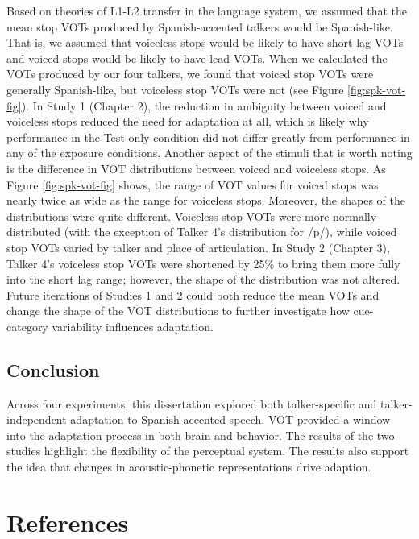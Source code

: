 \documentclass[
  12pt,
  twoside]{article}
\begin{document}
Based on theories of L1-L2 transfer in the language system, we assumed that the mean stop VOTs produced by Spanish-accented talkers would be Spanish-like.
That is, we assumed that voiceless stops would be likely to have short lag VOTs and voiced stops would be likely to have lead VOTs.
When we calculated the VOTs produced by our four talkers, we found that voiced stop VOTs were generally Spanish-like, but voiceless stop VOTs were not (see Figure \ref{fig:spk-vot-fig}).
In Study 1 (Chapter 2), the reduction in ambiguity between voiced and voiceless stops reduced the need for adaptation at all, which is likely why performance in the Test-only condition did not differ greatly from performance in any of the exposure conditions.
Another aspect of the stimuli that is worth noting is the difference in VOT distributions between voiced and voiceless stops.
As Figure \ref{fig:spk-vot-fig} shows, the range of VOT values for voiced stops was nearly twice as wide as the range for voiceless stops.
Moreover, the shapes of the distributions were quite different.
Voiceless stop VOTs were more normally distributed (with the exception of Talker 4's distribution for /p/), while voiced stop VOTs varied by talker and place of articulation.
In Study 2 (Chapter 3), Talker 4's voiceless stop VOTs were shortened by 25\% to bring them more fully into the short lag range; however, the shape of the distribution was not altered.
Future iterations of Studies 1 and 2 could both reduce the mean VOTs and change the shape of the VOT distributions to further investigate how cue-category variability influences adaptation.

\hypertarget{conclusion-2}{%
\subsection{Conclusion}\label{conclusion-2}}

Across four experiments, this dissertation explored both talker-specific and talker-independent adaptation to Spanish-accented speech.
VOT provided a window into the adaptation process in both brain and behavior.
The results of the two studies highlight the flexibility of the perceptual system.
The results also support the idea that changes in acoustic-phonetic representations drive adaption.

\FloatBarrier
\newpage

\section*{References}
\end{document}
